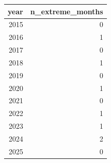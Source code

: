 \begin{tabular}{rr}
\toprule
year & n\_extreme\_months \\
\midrule
2015 & 0 \\
2016 & 1 \\
2017 & 0 \\
2018 & 1 \\
2019 & 0 \\
2020 & 1 \\
2021 & 0 \\
2022 & 1 \\
2023 & 1 \\
2024 & 2 \\
2025 & 0 \\
\bottomrule
\end{tabular}
